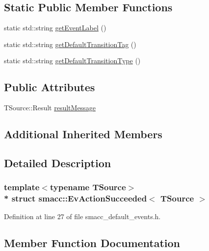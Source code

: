 \subsection*{Static Public Member Functions}
\begin{DoxyCompactItemize}
\item 
static std\+::string \hyperlink{structsmacc_1_1EvActionSucceeded_a25a140d9951be2d97f942918ae394cea}{get\+Event\+Label} ()
\item 
static std\+::string \hyperlink{structsmacc_1_1EvActionSucceeded_a92f4a367a2686aeb7cf2a1a407e1e35e}{get\+Default\+Transition\+Tag} ()
\item 
static std\+::string \hyperlink{structsmacc_1_1EvActionSucceeded_ac477d9e394ab9c31ba136e989daf3ed0}{get\+Default\+Transition\+Type} ()
\end{DoxyCompactItemize}
\subsection*{Public Attributes}
\begin{DoxyCompactItemize}
\item 
T\+Source\+::\+Result \hyperlink{structsmacc_1_1EvActionSucceeded_a77b393fd7a2340dc1ff29e9b8f45bc8d}{result\+Message}
\end{DoxyCompactItemize}
\subsection*{Additional Inherited Members}


\subsection{Detailed Description}
\subsubsection*{template$<$typename T\+Source$>$\\*
struct smacc\+::\+Ev\+Action\+Succeeded$<$ T\+Source $>$}



Definition at line 27 of file smacc\+\_\+default\+\_\+events.\+h.



\subsection{Member Function Documentation}
